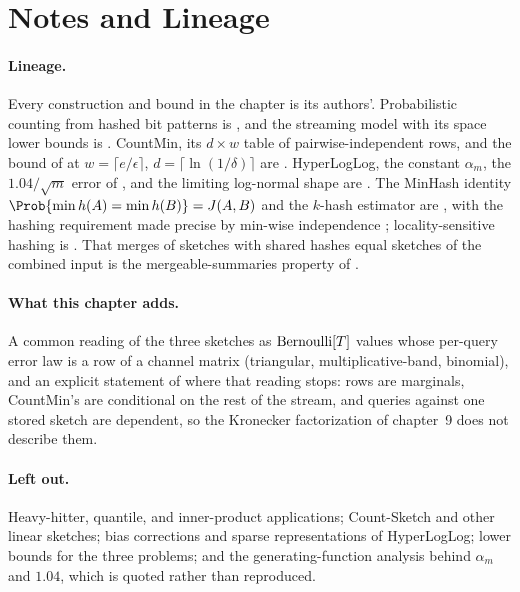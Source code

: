 %

\section{Notes and Lineage}
\label{sec:bib-notes-ch10}

\paragraph{Lineage.}
Every construction and bound in the chapter is its authors'. Probabilistic
counting from hashed bit patterns is \textcite{flajolet-martin-1985}, and the
streaming model with its space lower bounds is
\textcite{alon-matias-szegedy-1999}. CountMin, its $d \times w$ table of
pairwise-independent rows, and the bound of  at $w =
\lceil e/\epsilon \rceil$, $d = \lceil \ln(1/\delta) \rceil$ are
\textcite{cormode-muthukrishnan-2005}. HyperLogLog, the constant $\alpha_m$,
the $1.04/\sqrt{m}$ error of , and the limiting
log-normal shape are \textcite{flajolet-et-al-2007}. The MinHash identity
$\Prob{\min h(A) = \min h(B)} = J(A,B)$ and the $k$-hash estimator are
\textcite{broder-1997}, with the hashing requirement made precise by min-wise
independence \parencite{broder-et-al-2000}; locality-sensitive hashing is
\textcite{indyk-motwani-1998}. That merges of sketches with shared hashes equal
sketches of the combined input is the mergeable-summaries property of
\textcite{agarwal-et-al-2013}.

\paragraph{What this chapter adds.}
A common reading of the three sketches as $\mathrm{Bernoulli}[T]$ values whose per-query
error law is a row of a channel matrix (triangular, multiplicative-band,
binomial), and an explicit statement of where that reading stops: rows are
marginals, CountMin's are conditional on the rest of the stream, and queries
against one stored sketch are dependent, so the Kronecker factorization of
chapter~9 does not describe them.

\paragraph{Left out.}
Heavy-hitter, quantile, and inner-product applications; Count-Sketch and other
linear sketches; bias corrections and sparse representations of HyperLogLog;
lower bounds for the three problems; and the generating-function analysis
behind $\alpha_m$ and $1.04$, which is quoted rather than reproduced.
